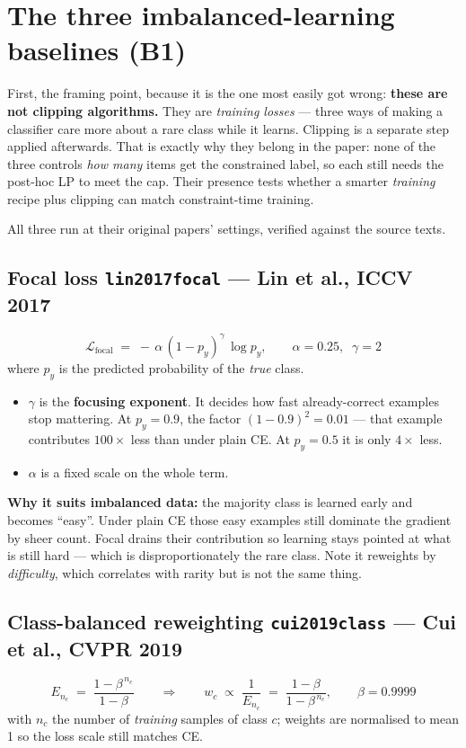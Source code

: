 \documentclass[11pt,a4paper]{article}
\begin{document}
\section{The three imbalanced-learning baselines (B1)}

First, the framing point, because it is the one most easily got wrong: \textbf{these are not
clipping algorithms.} They are \emph{training losses} --- three ways of making a classifier
care more about a rare class while it learns. Clipping is a separate step applied
afterwards. That is exactly why they belong in the paper: none of the three controls
\emph{how many} items get the constrained label, so each still needs the post-hoc LP to
meet the cap. Their presence tests whether a smarter \emph{training} recipe plus clipping
can match constraint-time training.

All three run at their original papers' settings, verified against the source texts.

\subsection{Focal loss \quad\small\texttt{lin2017focal} --- Lin et al., ICCV 2017}
\[
\mathcal{L}_{\text{focal}} \;=\; -\,\alpha\,(1-p_y)^{\gamma}\,\log p_y ,
\qquad \alpha = 0.25,\;\; \gamma = 2
\]
where $p_y$ is the predicted probability of the \emph{true} class.

\begin{itemize}
\item $\gamma$ is the \textbf{focusing exponent}. It decides how fast already-correct
examples stop mattering. At $p_y{=}0.9$, the factor $(1-0.9)^2 = 0.01$ --- that example
contributes $100\times$ less than under plain CE. At $p_y{=}0.5$ it is only $4\times$ less.
\item $\alpha$ is a fixed scale on the whole term.
\end{itemize}

\textbf{Why it suits imbalanced data:} the majority class is learned early and becomes
``easy''. Under plain CE those easy examples still dominate the gradient by sheer count.
Focal drains their contribution so learning stays pointed at what is still hard --- which
is disproportionately the rare class. Note it reweights by \emph{difficulty}, which
correlates with rarity but is not the same thing.

\subsection{Class-balanced reweighting \quad\small\texttt{cui2019class} --- Cui et al., CVPR 2019}
\[
E_{n_c} \;=\; \frac{1-\beta^{\,n_c}}{1-\beta}
\qquad\Longrightarrow\qquad
w_c \;\propto\; \frac{1}{E_{n_c}} \;=\; \frac{1-\beta}{1-\beta^{\,n_c}},
\qquad \beta = 0.9999
\]
with $n_c$ the number of \emph{training} samples of class $c$; weights are normalised to
mean 1 so the loss scale still matches CE.
\end{document}
